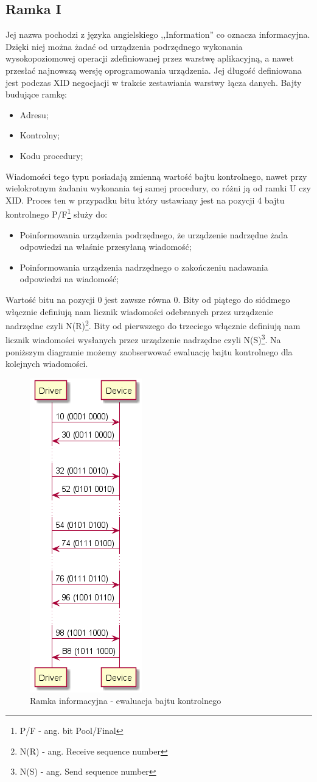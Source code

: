 \subsection{Ramka I}
Jej nazwa pochodzi z języka angielskiego ,,Information'' co oznacza informacyjna. \autocite{WIKI_ENG_HDLC}
Dzięki niej można żadać od urządzenia podrzędnego wykonania wysokopoziomowej operacji zdefiniowanej przez warstwę aplikacyjną, a nawet przesłać 
najnowszą wersję oprogramowania urządzenia. Jej długość definiowana jest podczas XID negocjacji w trakcie zestawiania warstwy łącza danych. 
\newline
Bajty budujące ramkę:
\begin{itemize}
	\item Adresu;
	\item Kontrolny;
	\item Kodu procedury;
\end{itemize}
Wiadomości tego typu posiadają zmienną wartość bajtu kontrolnego, nawet przy wielokrotnym żadaniu wykonania tej samej procedury, co różni ją od ramki U czy XID. 
\newline
Proces ten w przypadku bitu który ustawiany jest na pozycji 4 bajtu kontrolnego P/F\footnote{\label{Bit P/F} P/F - ang. bit Pool/Final} służy do:
\begin{itemize}
	\item Poinformowania urządzenia podrzędnego, że urządzenie nadrzędne żada odpowiedzi na właśnie przesyłaną wiadomość;
	\item Poinformowania urządzenia nadrzędnego o zakończeniu nadawania odpowiedzi na wiadomość;
\end{itemize}
Wartość bitu na pozycji 0 jest zawsze równa 0. 
Bity od piątego do siódmego włącznie definiują nam licznik wiadomości odebranych przez urządzenie nadrzędne czyli N(R)\footnote{\label{N(R)} N(R) - ang. Receive sequence number}. 
Bity od pierwszego do trzeciego włącznie definiują nam licznik wiadomości wysłanych przez urządzenie nadrzędne czyli N(S)\footnote{\label{N(S)} N(S) - ang. Send sequence number}.
Na poniższym diagramie możemy zaobserwować ewaluację bajtu kontrolnego dla kolejnych wiadomości.
\begin{figure}[h!]
\centering
\includegraphics[scale=1.0]{out/FrameI_Bajt_kontrolny/FrameI_Bajt_kontrolny.png}
\caption{Ramka informacyjna - ewaluacja bajtu kontrolnego}
\end{figure}
